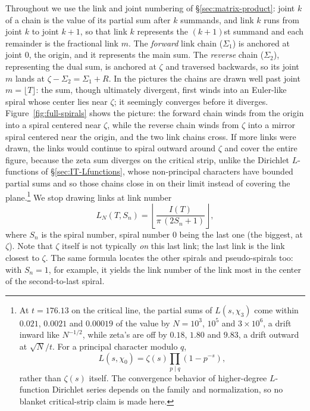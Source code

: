 \documentclass[11pt]{article}
\theoremstyle{definition}
\begin{document}
Throughout we use the link and joint numbering of
\S\ref{sec:matrix-product}: joint $k$ of a chain is the value of its partial
sum after $k$ summands, and link $k$ runs from joint $k$ to joint $k+1$, so
that link $k$ represents the $(k+1)$st summand and each remainder is the
fractional link $m$. The \emph{forward} link chain ($\Sigma_1$) is
anchored at joint $0$, the origin, and it represents the main sum. The
\emph{reverse} chain ($\Sigma_2$), representing the dual sum, is
anchored at $\zeta$ and traversed backwards, so its joint $m$ lands at
$\zeta-\Sigma_2=\Sigma_1+R$. In the pictures the chains are drawn well past
joint $m=\lfloor T\rfloor$: the sum, though ultimately divergent, first winds
into an Euler-like spiral whose center lies near $\zeta$; it seemingly
converges before it diverges. Figure~\ref{fig:full-spirals} shows the picture:
the forward chain winds from the origin into a spiral centered near $\zeta$,
while the reverse chain winds from $\zeta$ into a mirror spiral centered near
the origin, and the two link chains cross. If more links were drawn, the links would
continue to spiral outward around $\zeta$ and cover the entire figure, because
the zeta sum diverges on the critical strip, unlike the Dirichlet
$L$-functions of \S\ref{sec:IT-Lfunctions}, whose non-principal characters have bounded
partial sums and
so those chains close in on their limit instead of covering the plane.\footnote{At $t=176.13$ on the critical line, the partial
sums of $L(s,\chi_3)$ come within $0.021$, $0.0021$ and $0.00019$ of the value
by $N=10^{3}$, $10^{5}$ and $3\times10^{6}$, a drift inward like $N^{-1/2}$,
while zeta's are off by $0.18$, $1.80$ and $9.83$, a drift outward at
$\sqrt{N}/t$. For a principal character modulo $q$,
\[
L(s,\chi_0)=\zeta(s)\prod_{p\mid q}(1-p^{-s}),
\]
rather than $\zeta(s)$ itself. The convergence behavior of higher-degree
$L$-function Dirichlet series depends on the family and normalization, so
no blanket critical-strip claim is made here.} We stop drawing links at link number
\begin{equation}\label{eq:LN}
L_N(T,S_n)=\left\lfloor\frac{I(T)}{\pi\,(2S_n+1)}\right\rfloor,
\end{equation}
where $S_n$ is the spiral number, spiral number $0$ being the last one (the
biggest, at $\zeta$). Note that $\zeta$ itself is not typically \emph{on} this
last link; the last link is the link closest to $\zeta$. The same formula
locates the other spirals and pseudo-spirals too: with $S_n=1$, for example, it yields the link
number of the link most in the center of the second-to-last spiral.
\end{document}
